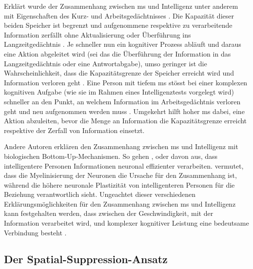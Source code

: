 \documentclass[11pt, twoside, a4paper]{book}		%
\begin{document}
Erklärt wurde der Zusammenhang zwischen \gls{ms} und Intelligenz unter anderem mit Eigenschaften des Kurz- und Arbeitsgedächtnisses \citep[z. B.][]{Jensen1982a, Jensen1982b, Jensen2006, Vernon1983}. 
Die Kapazität dieser beiden Speicher ist begrenzt und aufgenommene respektive zu verarbeitende Information zerfällt ohne Aktualisierung oder Überführung ins Langzeitgedächtnis \citep{Baddeley2009}. Je schneller nun ein kognitiver Prozess abläuft und daraus eine Aktion abgeleitet wird (sei das die Überführung der Information in das Langzeitgedächtnis oder eine Antwortabgabe), umso geringer ist die Wahrscheinlichkeit, dass die Kapazitätsgrenze der Speicher erreicht wird und Information verloren geht \citep{Jensen2006}.
Eine Person mit tiefem \gls{ms} stösst bei einer komplexen kognitiven Aufgabe (wie sie im Rahmen eines Intelligenztests vorgelegt wird) schneller an den Punkt, an welchem Information im Arbeitsgedächtnis verloren geht und neu aufgenommen werden muss \citep{Lehrl1988, Lehrl1990}. Umgekehrt hilft hoher \gls{ms} dabei, eine Aktion abzuleiten, bevor die Menge an Information die Kapazitätsgrenze erreicht respektive der Zerfall von Information einsetzt.

Andere Autoren erklären den Zusammenhang zwischen \gls{ms} und Intelligenz mit biologischen Bot\-tom-Up-Mech\-an\-is\-men. So gehen \citet{Bates1995}, \citet{Hendrickson1980} oder \citet{Reed1992} davon aus, dass intelligentere Personen Informationen neuronal effizienter verarbeiten. \citet{Miller1994} vermutet, dass die Myelinisierung der Neuronen die Ursache für den Zusammenhang ist, während \citet{Garlick2002} die höhere neuronale Plastizität von intelligenteren Personen für die Beziehung verantwortlich sieht. Ungeachtet dieser verschiedenen Erklärungsmöglichkeiten für den Zusammenhang zwischen \gls{ms} und Intelligenz kann festgehalten werden, dass zwischen der Geschwindigkeit, mit der Information verarbeitet wird, und komplexer kognitiver Leistung eine bedeutsame Verbindung besteht  \citep[sowohl auf manifester als auch auf latenter Ebene, siehe][]{Neubauer1996, Sheppard2008}.




\subsection{Der Spatial-Suppression-Ansatz \label{subsec:Der_Spatial-Suppression-Ansatz}}

\end{document}
